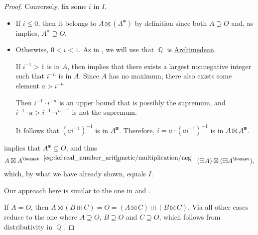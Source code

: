 \begin{proof}
  Conversely, fix some \( i \) in \( I \).
  \begin{itemize}
    \item If \( i \leq 0 \), then it belongs to \( A \boxtimes (A^\boxast) \) by definition since both \( A \supsetneq O \) and, as  implies, \( A^\boxast \supsetneq O \).

    \item Otherwise, \( 0 < i < 1 \). As in , we will use that \( \BbbQ \) is \hyperref[def:archimedean_semiring]{Archimedean}.

    If \( i^{-1} > 1 \) is in \( A \), then  implies that there exists a largest nonnegative integer such that \( i^{-n} \) is in \( A \). Since \( A \) has no maximum, there also exists some element \( a > i^{-n} \).

    Then \( i^{-1} \cdot i^{-n} \) is an upper bound that is possibly the supremum, and \( i^{-1} \cdot a > i^{-1} \cdot i^{n-1} \) is not the supremum.

    It follows that \( (ai^{-1})^{-1} \) is in \( A^\boxast \). Therefore, \( i = a \cdot (ai^{-1})^{-1} \) is in \( A \boxtimes A^\boxast \).
  \end{itemize}

    implies that \( A^\boxast \subsetneq O \), and thus
  \begin{equation*}
    A \boxtimes A^\boxast
    \reloset {\eqref{eq:def:real_number_arithmetic/multiplication/neg}} =
    (\boxminus A) \boxtimes (\boxminus A^\boxast),
  \end{equation*}
  which, by what we have already shown, equals \( I \).

   Our approach here is similar to the one in  and .

  If \( A = O \), then \( A \boxtimes (B \boxplus C) = O = (A \boxtimes C) \boxplus (B \boxtimes C) \). Via  all other cases reduce to the one where \( A \supseteq O \), \( B \supseteq O \) and \( C \supseteq O \), which follows from distributivity in \( \BbbQ \).


\end{proof}
